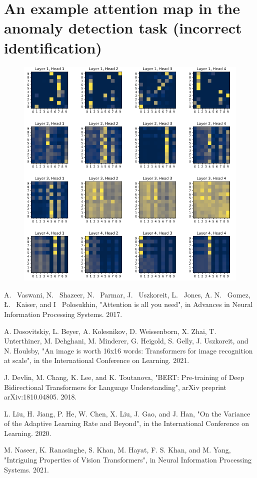 \documentclass[peerreview]{IEEEtran}
\begin{document}
\section{An example attention map in the anomaly detection task (incorrect identification)} \label{App:anomaly_attention_map_incorrect}
\begin{figure}[!h]
\centering
\includegraphics[width=1\columnwidth]{anomaly_attention_map_incorrect.png} 
\label{anomaly_attention_map_incorrect}
\end{figure}

\begin{thebibliography}{1}

A. ~Vaswani, N. ~Shazeer, N. ~Parmar, J. ~Uszkoreit, L. ~Jones, A. N. ~Gomez, Ł. ~Kaiser, and I ~Polosukhin, "Attention is all you need", in Advances in Neural Information Processing Systems. 2017.

A. Dosovitskiy, L. Beyer, A. Kolesnikov, D. Weissenborn, X. Zhai, T. Unterthiner, M. Dehghani, M. Minderer, G. Heigold, S. Gelly, J. Uszkoreit, and N. Houlsby, "An image is worth 16x16 words: Transformers for image recognition at scale", in the International Conference on Learning. 2021.

J. Devlin, M. Chang, K. Lee, and K. Toutanova, "BERT: Pre-training of Deep Bidirectional Transformers for Language Understanding", arXiv preprint arXiv:1810.04805. 2018. 

L. Liu, H. Jiang, P. He, W. Chen, X. Liu, J. Gao, and J. Han, "On the Variance of the Adaptive Learning
Rate and Beyond", in the International Conference on Learning. 2020. 

M. Naseer, K. Ranasinghe, S. Khan,
M. Hayat, F. S. Khan, and M. Yang, "Intriguing Properties of Vision Transformers", in Neural Information Processing Systems. 2021.
\end{thebibliography}
\end{document}
